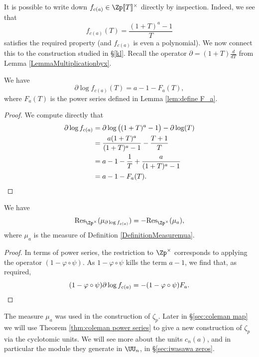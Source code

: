 \documentclass[a4paper,10pt, english, reqno]{smfart}
\newcommand{\lsem}{[\! [}
\newcommand{\rsem}{]\! ]}
\numberwithin{equation}{section}
\begin{document}
It is possible to write down $f_{c(a)} \in \Zp\lsem T\rsem^\times$ directly by inspection. Indeed, we see that
\[
f_{c(a)}(T) = \frac{(1+T)^a - 1}{T}
\]
satisfies the required property (and $f_{c(a)}$ is even a polynomial). We now connect this to the construction studied in \S\ref{kl}. Recall the operator $\partial = (1+T)\tfrac{d}{dT}$ from Lemma \ref{LemmaMultiplicationbyx}.

\begin{proposition}\label{prop:coleman zetap}
We have
\[\partial \log f_{c(a)}(T) = a - 1 - F_a(T),\]
where $F_a(T)$ is the power series defined in Lemma \ref{lem:define F_a}.
\end{proposition}

\begin{proof}
We compute directly that
\begin{align*}\partial \log f_{c(a)} &=   \partial \log \big( (1+T)^a - 1\big) - \partial\log(T)\\
&=  \frac{a(1+T)^a}{(1+T)^a - 1} - \frac{T+1}{T}\\
&= a - 1 - \frac{1}{T} + \frac{a}{(1+T)^a - 1} \\
&= a - 1 - F_a(T).\qedhere
\end{align*}
\end{proof}


\begin{lemma}\label{lem:relate cyclo to mua}
We have
\[
	\mathrm{Res}_{\Zp^\times}(\mu_{\partial\log f_{c(a)}}) = -\mathrm{Res}_{\Zp^\times}(\mu_a),
	\]
where $\mu_a$ is the measure of Definition \ref{DefinitionMeasuremua}.
\end{lemma}

\begin{proof}
    In terms of power series, the restriction to $\Zp^\times$ corresponds to applying the operator $(1-\varphi\circ\psi)$. As $1-\varphi\circ\psi$ kills the term $a-1$, we find that, as required,
	\[
	(1-\varphi\circ\psi)\partial\log f_{c(a)} = - (1-\varphi\circ\psi)F_a. \qedhere
	\]
\end{proof}

\begin{remark} \label{rem:restriction Coleman}
	The measure $\mu_a$ was used in the construction of $\zeta_p$. Later in \S\ref{sec:coleman map} we will use Theorem \ref{thm:coleman power series} to give a new construction of $\zeta_p$ via the cyclotomic units. We will see more about the units $c_n(a)$, and in particular the module they generate in $\UU_n$, in \S\ref{sec:iwasawa zeros}.
\end{remark}
\end{document}
